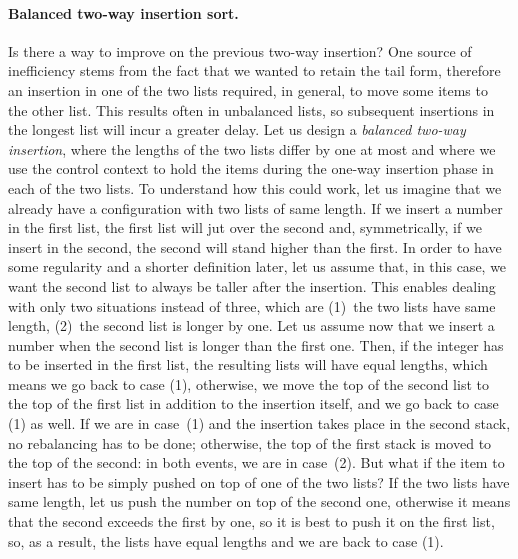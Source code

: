 \medskip

\paragraph{Balanced two\hyp{}way insertion sort.}

Is there a way to improve on the previous two\hyp{}way insertion? One
source of inefficiency stems from the fact that we wanted to retain
the tail form, therefore an insertion in one of the two lists
required, in general, to move some items to the other list. This
results often in unbalanced lists, so subsequent insertions in the
longest list will incur a greater delay. Let us design a
\emph{balanced two\hyp{}way insertion}, where the lengths of the two
lists differ by one at most and where we use the control context to
hold the items during the one\hyp{}way insertion phase in each of the
two lists. To understand how this could work, let us imagine that we
already have a configuration with two lists of same length. If we
insert a number in the first list, the first list will jut over the
second and, symmetrically, if we insert in the second, the second will
stand higher than the first. In order to have some regularity and a
shorter definition later, let us assume that, in this case, we want
the second list to always be taller after the insertion. This enables
dealing with only two situations instead of three, which are (1)~the
two lists have same length, (2)~the second list is longer by one. Let
us assume now that we insert a number when the second list is longer
than the first one. Then, if the integer has to be inserted in the
first list, the resulting lists will have equal lengths, which means
we go back to case (1), otherwise, we move the top of the second list
to the top of the first list in addition to the insertion itself, and
we go back to case (1) as well. If we are in case~(1) and the
insertion takes place in the second stack, no rebalancing has to be
done; otherwise, the top of the first stack is moved to the top of the
second: in both events, we are in case~(2). But what if the item to
insert has to be simply pushed on top of one of the two lists? If the
two lists have same length, let us push the number on top of the
second one, otherwise it means that the second exceeds the first by
one, so it is best to push it on the first list, so, as a result, the
lists have equal lengths and we are back to case (1).

